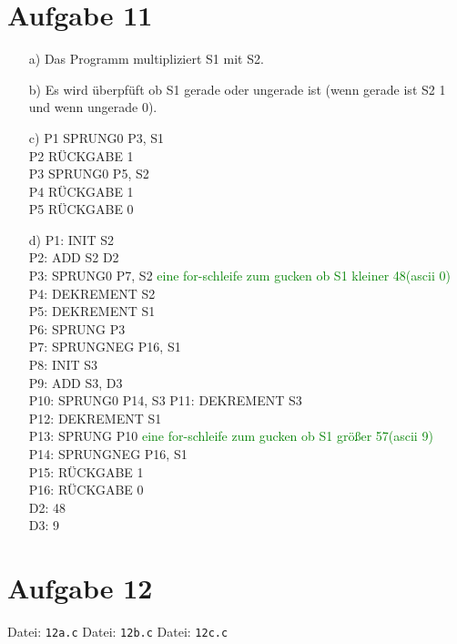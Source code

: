\documentclass[paper=a4, %
         fontsize=10pt,  %
         oneside,        %
         headsepline,    %
         notitlepage     %
]{scrartcl}              %
\newcommand{\includecode}[1]{}
\newcommand{\includecodewithfilename}[1]{Datei: \texttt{#1}\vspace*{-1.5mm}\includecode{#1}}
\newcommand{\aufgabe}[1]{\section*{Aufgabe #1}}
\begin{document}
\aufgabe{11}
\begin{enumerate}
	\item[a)] Das Programm multipliziert S1 mit S2.
	\item[b)] Es wird überpfüft ob S1 gerade oder ungerade ist (wenn gerade ist S2 1 und wenn ungerade 0).
	\item[c)]
	P1 SPRUNG0 P3, S1\\
	P2 RÜCKGABE 1\\
	P3 SPRUNG0 P5, S2\\
	P4 RÜCKGABE 1\\
	P5 RÜCKGABE 0
	\item[d)]
	P1: INIT S2\\
	P2: ADD S2 D2\\
	P3: SPRUNG0 P7, S2 \textcolor{green}{eine for-schleife zum gucken ob S1 kleiner 48(ascii 0)}\\
	P4: DEKREMENT S2\\
	P5: DEKREMENT S1\\
	P6: SPRUNG P3\\
	P7: SPRUNGNEG P16, S1\\
	P8: INIT S3\\
	P9: ADD S3, D3\\
	P10: SPRUNG0 P14, S3
	P11: DEKREMENT S3\\ 
	P12: DEKREMENT S1\\
	P13: SPRUNG P10\textcolor{green}{ eine for-schleife zum gucken ob S1 größer 57(ascii 9)}\\
	P14: SPRUNGNEG P16, S1\\
	P15: RÜCKGABE 1\\
	P16: RÜCKGABE 0\\
	D2: 48\\
	D3: 9
\end{enumerate}
\aufgabe{12}
\includecodewithfilename{12a.c}
\includecodewithfilename{12b.c}
\includecodewithfilename{12c.c}

\end{document}
